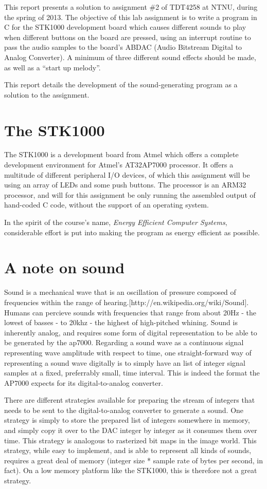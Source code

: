 This report presents a solution to assignment \#2 of TDT4258 at NTNU, during the spring of 2013.
The objective of this lab assignment is to write a program in C for the STK1000 development board which causes different sounds to play when different buttons on the board are pressed, using an interrupt routine to pass the audio samples to the board's ABDAC (Audio Bitstream Digital to Analog Converter).
A minimum of three different sound effects should be made, as well as a ``start up melody''.

This report details the development of the sound-generating program as a solution to the assignment.
\section{The STK1000}
The STK1000 is a development board from Atmel which offers a complete development environment for Atmel's AT32AP7000 processor.
It offers a multitude of different peripheral I/O devices, of which this assignment will be using an array of LEDs and some push buttons.
The processor is an ARM32 processor, and will for this assignment be only running the assembled output of hand-coded C code, without the support of an operating system.

In the spirit of the course's name, \emph{Energy Efficient Computer Systems}, considerable effort is put into making the program as energy efficient as possible.

\section{A note on sound}
Sound is a mechanical wave that is an oscillation of pressure composed of frequencies within the range of hearing.[http://en.wikipedia.org/wiki/Sound].
Humans can percieve sounds with frequencies that range from about 20Hz - the lowest of basses - to 20khz - the highest of high-pitched whining.
Sound is inherently analog, and requires some form of digital representation to be able to be generated by the ap7000.
Regarding a sound wave as a continuous signal representing wave amplitude with respect to time, one straight-forward way of representing a sound wave digitally is to simply have an list of integer signal samples at a fixed, preferrably small, time interval.
This is indeed the format the AP7000 expects for its digital-to-analog converter.

There are different strategies available for preparing the stream of integers that needs to be sent to the digital-to-analog converter to generate a sound.
One strategy is simply to store the prepared list of integers somewhere in memory, and simply copy it over to the DAC integer by integer as it consumes them over time.
This strategy is analogous to rasterized bit maps in the image world.
This strategy, while easy to implement, and is able to represent all kinds of sounds, requires a great deal of memory (integer size * sample rate of bytes per second, in fact).
On a low memory platform like the STK1000, this is therefore not a great strategy.

